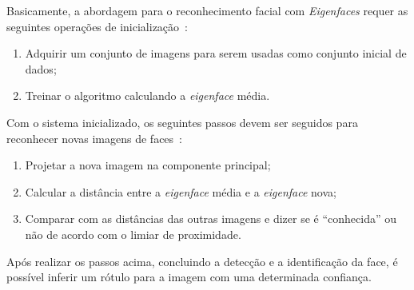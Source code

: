 	Basicamente, a abordagem para o reconhecimento facial com \textit{Eigenfaces} requer as
	seguintes operações de inicialização~\cite{turk}:

	\begin{enumerate}
		\item Adquirir um conjunto de imagens para serem usadas como conjunto inicial de dados;
		\item Treinar o algoritmo calculando a \textit{eigenface} média.
	\end{enumerate}

	Com o sistema inicializado, os seguintes passos devem ser seguidos para
	reconhecer novas imagens de faces~\cite{turk}:
	
	\begin{enumerate}
		\item Projetar a nova imagem na componente principal;
		\item Calcular a distância entre a \textit{eigenface} média e a \textit{eigenface} nova;
		\item Comparar com as distâncias das outras imagens e dizer se é ``conhecida'' ou não de acordo com o limiar de proximidade.
	\end{enumerate}
	
	Após realizar os passos acima, concluindo a detecção e a identificação da face,
	é possível inferir um rótulo para a imagem com uma determinada confiança.
